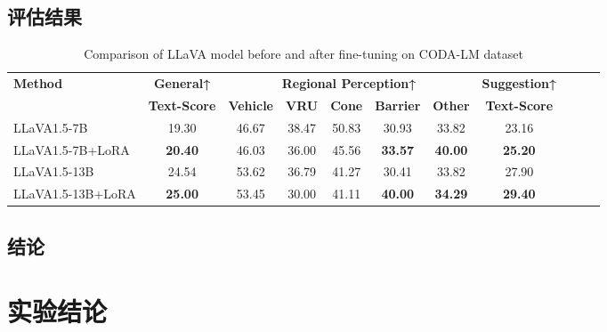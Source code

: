 \documentclass[
    linespread = 1.25
]{ctexart}
\begin{document}
\subsection{评估结果}

\begin{table}[htbp]
  \centering
  \caption{Comparison of LLaVA model before and after fine-tuning on CODA-LM dataset}
  \small %
  \begin{tabular}{lcccccccccc}
    \toprule
    \textbf{Method}   & \textbf{General↑}   & \multicolumn{5}{c}{\textbf{Regional Perception↑}} & \textbf{Suggestion↑}                                                                           \\
    \cmidrule(r){3-7}
                      & \textbf{Text-Score} & \textbf{Vehicle}                                  & \textbf{VRU}         & \textbf{Cone} & \textbf{Barrier} & \textbf{Other} & \textbf{Text-Score} \\
    \midrule
    LLaVA1.5-7B       & 19.30               & 46.67                                             & 38.47                & 50.83         & 30.93            & 33.82          & 23.16               \\
    LLaVA1.5-7B+LoRA  & \textbf{20.40}      & 46.03                                             & 36.00                & 45.56         & \textbf{33.57}   & \textbf{40.00} & \textbf{25.20}      \\
    \midrule
    LLaVA1.5-13B      & 24.54               & 53.62                                             & 36.79                & 41.27         & 30.41            & 33.82          & 27.90               \\
    LLaVA1.5-13B+LoRA & \textbf{25.00}      & 53.45                                             & 30.00                & 41.11         & \textbf{40.00}   & \textbf{34.29} & \textbf{29.40}      \\
    \bottomrule
  \end{tabular}
\end{table}

\subsection{结论}

\section{实验结论}
\end{document}
